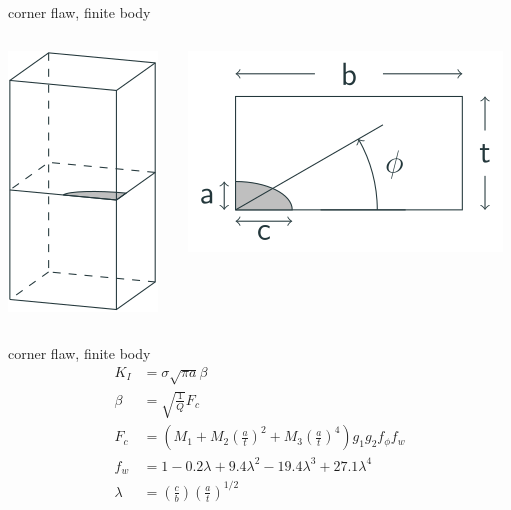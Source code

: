 \documentclass[
  letterpaper,
  ignorenonframetext,
  aspectratio=43,
  handout,
  12pt]{beamer}
\let\Oldincludegraphics\includegraphics
\renewcommand{\includegraphics}[2][]{\Oldincludegraphics[width=\textwidth,height=0.7\textheight,keepaspectratio]{#2}}
\begin{document}
\begin{frame}{corner flaw, finite body}
\protect\hypertarget{corner-flaw-finite-body}{}
\begin{columns}[T]
\begin{column}{0.5\textwidth}
\includegraphics{../images/corner crack.svg}
\end{column}

\begin{column}{0.5\textwidth}
\includegraphics{../images/corner-crack-plane.svg}
\end{column}
\end{columns}
\end{frame}

\begin{frame}{corner flaw, finite body}
\protect\hypertarget{corner-flaw-finite-body-1}{}
\[\begin{aligned}
  K_I &= \sigma \sqrt{\pi a} \beta\\
  \beta &= \sqrt{\frac{1}{Q}} F_c\\
  F_c &= \left(M_1 + M_2 \left(\frac{a}{t}\right)^2 + M_3 \left(\frac{a}{t}\right)^4\right)g_1 g_2 f_\phi f_w\\
  f_w &= 1 - 0.2 \lambda + 9.4 \lambda^2 - 19.4 \lambda^3 + 27.1 \lambda^4\\
  \lambda &= \left(\frac{c}{b}\right)\left(\frac{a}{t}\right)^{1/2}
\end{aligned}\]
\end{frame}
\end{document}

